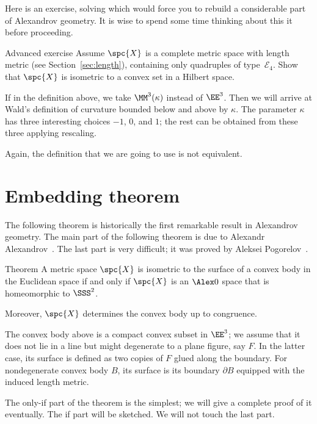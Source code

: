 Here is an exercise, solving which would force you to rebuild a considerable part of Alexandrov geometry.
It is wise to spend some time thinking about this it before proceeding.

\begin{thm}{Advanced exercise}\label{ex:convex-set}
Assume $\spc{X}$ is a complete metric space with length metric (see Section~\ref{sec:length}), 
containing only quadruples of type~$\mathcal{E}_4$.
Show that $\spc{X}$ is isometric to a convex set in a Hilbert space.
\end{thm}

If in the definition above, we take $\MM^3(\kappa)$ instead of $\EE^3$.
Then we will arrive at Wald's definition of curvature bounded below and above by $\kappa$.
The parameter $\kappa$ has three interesting choices $-1$, $0$, and $1$;
the rest can be obtained from these three applying rescaling.

Again, the definition that we are going to use is not equivalent.


\section{Embedding theorem}

The following theorem is historically the first remarkable result in Alexandrov geometry.
The main part of the following theorem is due to Alexandr Alexandrov~\cite{alexandrov-1948}.
The last part is very difficult; it was proved by Aleksei Pogorelov~\cite{pogorelov}.

\begin{thm}{Theorem}\label{thm:alexandrov+pogorelov}
A metric space $\spc{X}$ is isometric to the surface of a convex body in the Euclidean space if and only if $\spc{X}$ is an $\Alex0$ space that is homeomorphic to $\SSS^2$.

Moreover, $\spc{X}$ determines the convex body up to congruence.
\end{thm}

The convex body above is a compact convex subset in $\EE^3$;
we assume that it does not lie in a line but might degenerate to a plane figure, say $F$.
In the latter case, its surface is defined as two copies of $F$ glued along the boundary.
For nondegenerate convex body $B$, its surface is its boundary $\partial B$ equipped with the induced length metric. 

The only-if part of the theorem is the simplest; we will give a complete proof of it eventually.
The if part will be sketched.
We will not touch the last part.
